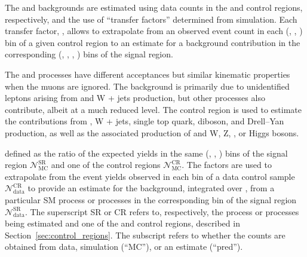 The \lost and \znunuj backgrounds are estimated using data counts in
the \mj and \mmj control regions, respectively, and the use of
``transfer factors'' determined from simulation. Each transfer factor,
\tf, allows to extrapolate from an observed event count in each
(\njet, \nb, \scalht) bin of a given control region to an estimate for
a background contribution in the corresponding (\njet, \nb, \scalht,
\mht) bins of the signal region.

The \znunuj and \zmumuj processes have different acceptances but
similar kinematic properties when the muons are ignored. The \lost
background is primarily due to unidentified leptons arising from
\ttbar and W + jets production, but other processes also contribute,
albeit at a much reduced level. The \mj control region is used to
estimate the \lost contributions from \ttbar, W + jets, single top
quark, diboson, and Drell--Yan production, as well as the associated
production of \ttbar and W, Z, \gamma, or Higgs bosons.


defined as the ratio of the expected yields in the same (\njet, \nb,
\scalht) bins of the signal region $\mathcal{N}^\text{SR}_\text{MC}$
and one of the control regions $\mathcal{N}^\text{CR}_\text{MC}$.  The
\tf factors are used to extrapolate from the event yields observed in
each bin of a data control sample $\mathcal{N}^\text{CR}_\text{data}$
to provide an estimate for the background, integrated over \HTmiss,
from a particular SM process or processes in the corresponding bin of
the signal region $\mathcal{N}^\text{SR}_\text{data}$.  The
superscript SR or CR refers to, respectively, the process or processes
being estimated and one of the \mj and \mmj control regions, described
in Section~\ref{sec:control_regions}. The subscript refers to whether
the counts are obtained from data, simulation (``MC''), or an estimate
(``pred'').



